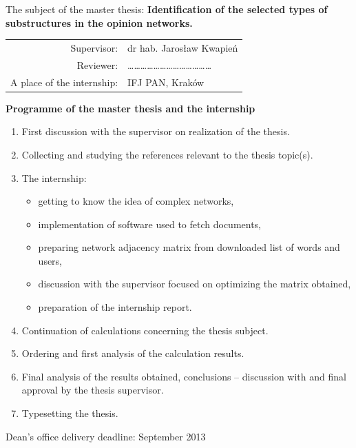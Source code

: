 {The subject of the master thesis:
{\bf Identification of the selected types of substructures in the opinion networks.}\\

\begin{tabular}{rl}
  Supervisor:                & dr hab. Jarosław Kwapień\\
  Reviewer:                  & \ldots\ldots\ldots\ldots\ldots\ldots\ldots\ldots\ldots\ldots\ldots\ldots\ldots\\
  A place of the internship: & IFJ PAN, Kraków\\
\end{tabular}

\begin{center}
  {\bf Programme of the master thesis and the internship}
\end{center}

\begin{enumerate}
  \item First discussion with the supervisor on realization of the thesis.
  \item Collecting and studying the references relevant to the thesis topic(s).
  \item The internship:
  \begin{itemize}
    \item getting to know the idea of complex networks,
    \item implementation of software used to fetch documents,
    \item preparing network adjacency matrix from downloaded list of words and users,
    \item discussion with the supervisor focused on optimizing the matrix obtained,
    \item preparation of the internship report.
  \end{itemize}
  \item Continuation of calculations concerning the thesis subject.
  \item Ordering and first analysis of the calculation results.
  \item Final analysis of the results obtained, conclusions -- discussion with and final approval by the thesis supervisor.
  \item Typesetting the thesis.
\end{enumerate}


\noindent
Dean's office delivery deadline: September 2013\\[1cm]

}
